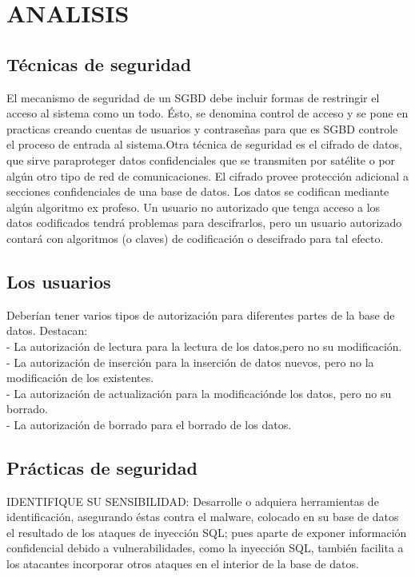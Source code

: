 \section{ANALISIS}
\subsection{Técnicas de seguridad}
El mecanismo de seguridad de un SGBD debe incluir formas de restringir el acceso al sistema como un todo. Ésto, se denomina control de acceso y se pone en practicas creando cuentas de usuarios y contraseñas para que es SGBD controle el proceso de entrada al sistema.Otra técnica de seguridad es el cifrado de datos, que sirve paraproteger datos confidenciales que se transmiten por satélite o por algún otro tipo de red de comunicaciones. El cifrado provee protección adicional a secciones confidenciales de una base de datos. Los datos se codifican mediante algún algoritmo ex profeso. Un usuario no autorizado que tenga acceso a los datos codificados tendrá problemas para descifrarlos, pero un usuario autorizado contará con algoritmos (o claves) de codificación o descifrado para tal efecto. 

\subsection{Los usuarios}
Deberían tener varios tipos de autorización para diferentes partes de la base de datos. Destacan:\\
- La autorización de lectura para la lectura de los datos,pero no su modificación.\\
- La autorización de inserción para la inserción de datos nuevos, pero no la modificación de los existentes.\\
- La autorización de actualización para la modificaciónde los datos, pero no su borrado.\\
- La autorización de borrado para el borrado de los datos.
 
\subsection{Prácticas de seguridad}
IDENTIFIQUE SU SENSIBILIDAD: 
Desarrolle o adquiera herramientas de identificación, asegurando éstas contra el malware, colocado en su base de datos el resultado de los ataques de inyección SQL; pues aparte de exponer información confidencial debido a vulnerabilidades, como la inyección SQL, también facilita a los atacantes incorporar otros ataques en el interior de la base de datos. \\

